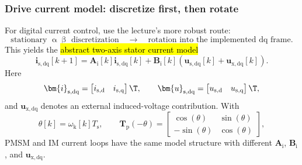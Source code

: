 \begin{frame}
	\frametitle{Drive current model: discretize first, then rotate}
	For digital current control, use the lecture's more robust route:
	\begin{equation*}
		\text{stationary }\upalpha\upbeta\text{ discretization}
		\quad\rightarrow\quad
		\text{rotation into the implemented dq}\text{ frame}.
	\end{equation*}\pause%
	This yields the \hl{abstract two-axis stator current model}
	\begin{equation*}
		\boxed{\bm{i}_{\mathrm{s},\mathrm{dq}}[k+1]
			=\bm{A}_{\mathrm{i}}[k]\bm{i}_{\mathrm{s},\mathrm{dq}}[k]
			+\bm{B}_{\mathrm{i}}[k]
			\left(\bm{u}_{\mathrm{s},\mathrm{dq}}[k]+\bm{u}_{\mathrm{x},\mathrm{dq}}[k]\right).}
	\end{equation*}\pause%
	Here
	\begin{equation*}
		\bm{i}_{\mathrm{s},\mathrm{dq}}=
		\begin{bmatrix}i_{\mathrm{s},\mathrm{d}}&i_{\mathrm{s},\mathrm{q}}\end{bmatrix}\T,
		\qquad
		\bm{u}_{\mathrm{s},\mathrm{dq}}=
		\begin{bmatrix}u_{\mathrm{s},\mathrm{d}}&u_{\mathrm{s},\mathrm{q}}\end{bmatrix}\T,
	\end{equation*}
	and $\bm{u}_{\mathrm{x},\mathrm{dq}}$ denotes an external induced-voltage contribution. \pause With
	\begin{equation*}
		\theta[k]=\omega_{\mathrm{k}}[k]T_{\mathrm{s}},
		\qquad
		\bm{T}_{\mathrm{p}}(-\theta)=
		\begin{bmatrix}\cos(\theta)&\sin(\theta)\\-\sin(\theta)&\cos(\theta)\end{bmatrix},
	\end{equation*}\pause%
	PMSM and IM current loops have the same model structure with different $\bm{A}_{\mathrm{i}}$, $\bm{B}_{\mathrm{i}}$, and $\bm{u}_{\mathrm{x},\mathrm{dq}}$.
\end{frame}



